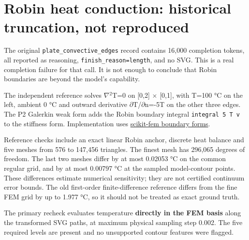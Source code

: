 \documentclass[
  11pt,
  a4paper,
]{article}
\begin{document}
\section{Robin heat conduction: historical truncation, not
reproduced}\label{robin-heat-conduction-historical-truncation-not-reproduced}

The original \texttt{plate\_convective\_edges} record contains 16,000
completion tokens, all reported as reasoning,
\texttt{finish\_reason=length}, and no SVG. This is a real completion
failure for that call. It is not enough to conclude that Robin
boundaries are beyond the model's capability.

The independent reference solves \(\nabla\)\(^2\)T=0 on {[}0,2{]}
\(\times\) {[}0,1{]}, with T=100 °C on the left, ambient 0 °C and
outward derivative \(\partial\)T/\(\partial\)n=-5T on the other three
edges. The P2 Galerkin weak form adds the Robin boundary integral
\texttt{integral\ 5\ T\ v} to the stiffness form. Implementation uses
\href{https://scikit-fem.readthedocs.io/en/stable/api.html}{scikit-fem
boundary forms}.

Reference checks include an exact linear Robin anchor, discrete heat
balance and five meshes from 576 to 147,456 triangles. The finest mesh
has 296,065 degrees of freedom. The last two meshes differ by at most
0.02053 °C on the common regular grid, and by at most 0.00797 °C at the
sampled model-contour points. These differences estimate numerical
sensitivity; they are not certified continuum error bounds. The old
first-order finite-difference reference differs from the fine FEM grid
by up to 1.977 °C, so it should not be treated as exact ground truth.

The primary recheck evaluates temperature \textbf{directly in the FEM
basis} along the transformed SVG paths, at maximum physical sampling
step 0.002. The five required levels are present and no unsupported
contour features were flagged.
\end{document}
